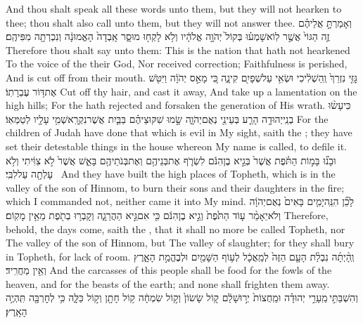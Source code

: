 {And thou shalt speak all these words unto them, but they will not hearken to thee; thou shalt also call unto them, but they will not answer thee.}
{וְאָמַרְתָּ֣ אֲלֵיהֶ֗ם זֶ֤ה הַגּוֹי֙ אֲשֶׁ֣ר לֽוֹא\maqqaf שָׁמְע֗וּ בְּקוֹל֙ יְהֹוָ֣ה אֱלֹהָ֔יו וְלֹ֥א לָקְח֖וּ מוּסָ֑ר אָֽבְדָה֙ הָאֱמוּנָ֔ה וְנִכְרְתָ֖ה מִפִּיהֶֽם׃ \setuma }
{Therefore thou shalt say unto them: This is the nation that hath not hearkened To the voice of the \lord\space their God, Nor received correction; Faithfulness is perished, And is cut off from their mouth.}
{גׇּזִּ֤י נִזְרֵךְ֙ וְֽהַשְׁלִ֔יכִי וּשְׂאִ֥י עַל\maqqaf שְׁפָיִ֖ם קִינָ֑ה כִּ֚י מָאַ֣ס יְהֹוָ֔ה וַיִּטֹּ֖שׁ אֶת\maqqaf דּ֥וֹר עֶבְרָתֽוֹ׃}
{Cut off thy hair, and cast it away, And take up a lamentation on the high hills; For the \lord\space hath rejected and forsaken the generation of His wrath.}
{כִּי\maqqaf עָשׂ֨וּ בְנֵֽי\maqqaf יְהוּדָ֥ה הָרַ֛ע בְּעֵינַ֖י נְאֻם\maqqaf יְהֹוָ֑ה שָׂ֣מוּ שִׁקּוּצֵיהֶ֗ם בַּבַּ֛יִת אֲשֶׁר\maqqaf נִקְרָֽא\maqqaf שְׁמִ֥י עָלָ֖יו לְטַמְּאֽוֹ׃}
{For the children of Judah have done that which is evil in My sight, saith the \lord; they have set their detestable things in the house whereon My name is called, to defile it.}
{וּבָנ֞וּ בָּמ֣וֹת הַתֹּ֗פֶת אֲשֶׁר֙ בְּגֵ֣יא בֶן\maqqaf הִנֹּ֔ם לִשְׂרֹ֛ף אֶת\maqqaf בְּנֵיהֶ֥ם וְאֶת\maqqaf בְּנֹתֵיהֶ֖ם בָּאֵ֑שׁ אֲשֶׁר֙ לֹ֣א צִוִּ֔יתִי וְלֹ֥א עָלְתָ֖ה עַל\maqqaf לִבִּֽי׃ \petucha }
{And they have built the high places of Topheth, which is in the valley of the son of Hinnom, to burn their sons and their daughters in the fire; which I commanded not, neither came it into My mind.}
{לָכֵ֞ן הִנֵּֽה\maqqaf יָמִ֤ים בָּאִים֙ נְאֻם\maqqaf יְהֹוָ֔ה וְלֹא\maqqaf יֵאָמֵ֨ר ע֤וֹד הַתֹּ֙פֶת֙ וְגֵ֣יא בֶן\maqqaf הִנֹּ֔ם כִּ֖י אִם\maqqaf גֵּ֣יא הַהֲרֵגָ֑ה וְקָבְר֥וּ בְתֹ֖פֶת מֵאֵ֥ין מָקֽוֹם׃}
{Therefore, behold, the days come, saith the \lord, that it shall no more be called Topheth, nor The valley of the son of Hinnom, but The valley of slaughter; for they shall bury in Topheth, for lack of room.}
{וְֽהָ֨יְתָ֜ה נִבְלַ֨ת הָעָ֤ם הַזֶּה֙ לְמַֽאֲכָ֔ל לְע֥וֹף הַשָּׁמַ֖יִם וּלְבֶהֱמַ֣ת הָאָ֑רֶץ וְאֵ֖ין מַחֲרִֽיד׃}
{And the carcasses of this people shall be food for the fowls of the heaven, and for the beasts of the earth; and none shall frighten them away.}
{וְהִשְׁבַּתִּ֣י \legarmeh  מֵֽעָרֵ֣י יְהוּדָ֗ה וּמֵֽחֻצוֹת֙ יְר֣וּשָׁלַ֔͏ִם ק֤וֹל שָׂשׂוֹן֙ וְק֣וֹל שִׂמְחָ֔ה ק֥וֹל חָתָ֖ן וְק֣וֹל כַּלָּ֑ה כִּ֥י לְחׇרְבָּ֖ה תִּֽהְיֶ֥ה הָאָֽרֶץ׃}
